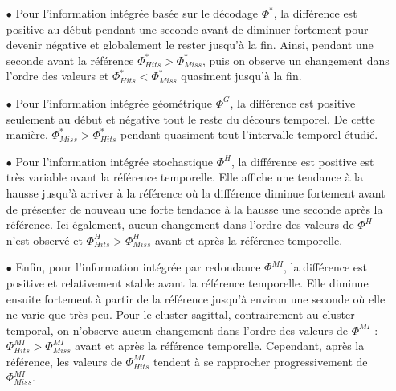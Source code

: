 \begin{itemize}
\item[$\bullet$] Pour l'information intégrée basée sur le décodage $\Phi^{*}$, la différence est positive au début pendant une seconde avant de diminuer fortement pour devenir négative et globalement le rester jusqu'à la fin. 
Ainsi, pendant une seconde avant la référence $\Phi^{*}_{Hits} > \Phi^{*}_{Miss}$, puis on observe un changement dans l'ordre des valeurs et $\Phi^{*}_{Hits} < \Phi^{*}_{Miss}$ quasiment jusqu'à la fin.
\item[$\bullet$] Pour l'information intégrée géométrique $\Phi^{G}$, la différence est positive seulement au début et négative tout le reste du décours temporel. 
De cette manière, $\Phi^{*}_{Miss} > \Phi^{*}_{Hits}$ pendant quasiment tout l'intervalle temporel étudié. 
\item[$\bullet$] Pour l'information intégrée stochastique $\Phi^{H}$, la différence est positive est très variable avant la référence temporelle. 
Elle affiche une tendance à la hausse jusqu'à arriver à la référence où la différence diminue fortement avant de présenter de nouveau une forte tendance à la hausse une seconde après la référence. 
Ici également, aucun changement dans l'ordre des valeurs de $\Phi^{H}$ n'est observé et $\Phi^{H}_{Hits} > \Phi^{H}_{Miss}$ avant et après la référence temporelle. 
\item[$\bullet$] Enfin, pour l'information intégrée par redondance $\Phi^{MI}$, la différence est positive et relativement stable avant la référence temporelle. 
Elle diminue ensuite fortement à partir de la référence jusqu'à environ une seconde où elle ne varie que très peu. 
Pour le cluster sagittal, contrairement au cluster temporal, on n'observe aucun changement dans l'ordre des valeurs de $\Phi^{MI}$ : $\Phi^{MI}_{Hits} > \Phi^{MI}_{Miss}$ avant et après la référence temporelle. 
Cependant, après la référence, les valeurs de $\Phi^{MI}_{Hits}$ tendent à se rapprocher progressivement de $\Phi^{MI}_{Miss}$. \\
\end{itemize}


